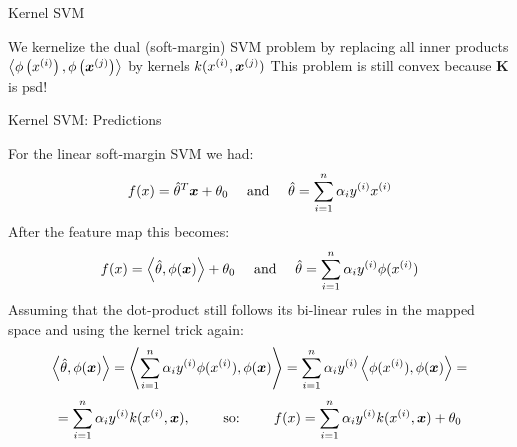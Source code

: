 \begin{frame}{Kernel SVM}


We kernelize the dual (soft-margin) SVM problem by replacing all inner products $\left\langle \phi\left(x^{(i)}\right), \phi\left(\bm{x}^{(j)}\right) \right\rangle$ by kernels $k(x^{(i)}, \bm{x}^{(j)})$
This problem is still convex because $\bm{K}$ is psd!

\end{frame}

\begin{frame}{Kernel SVM: Predictions}

For the linear soft-margin SVM we had:
  $$ f(x) = \hat{\theta}^T \bm{x} + \theta_0 \quad \text{ and } \quad \hat{\theta} = \sum_{i=1}^n \alpha_i y^{(i)} x^{(i)} $$  
After the feature map this becomes:
$$ f(x) = \left\langle \hat{\theta}, \phi(\bm{x}) \right\rangle + \theta_0 \quad \text{ and } \quad \hat{\theta} = \sum_{i=1}^n \alpha_i y^{(i)} \phi(x^{(i)}) $$  
Assuming that the dot-product still follows its bi-linear rules in the mapped space and using the kernel
trick again:
$$ 
\left\langle \hat{\theta}, \phi(\bm{x}) \right\rangle = 
\left\langle \sum_{i=1}^n \alpha_i y^{(i)} \phi(x^{(i)}), \phi(\bm{x}) \right\rangle =
\sum_{i=1}^n \alpha_i y^{(i)} \left\langle \phi(x^{(i)}), \phi(\bm{x}) \right\rangle =
$$
$$
= \sum_{i=1}^n \alpha_i y^{(i)} k(x^{(i)}, \bm{x}), \qquad \text{ so: } \qquad f(x) = \sum_{i=1}^n \alpha_i y^{(i)} k(x^{(i)}, \bm{x})  + \theta_0
$$  
  

\end{frame}


